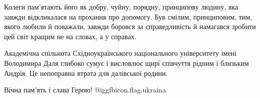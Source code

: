 Колеги пам’ятають його як добру, чуйну, порядну, принципову людину, яка завжди
відкликалася на прохання про допомогу.  Був смілим,  принциповим, тим, якого
любили й поважали, завжди боровся за справедливість й намагався зробити цей
світ кращим не на словах, а у справах.


Академічна спільнота Східноукраїнського національного університету імені
Володимира Даля глибоко сумує і висловлює щирі співчуття рідним і близьким
Андрія. Це непоправна втрата для далівської родини. 

Вічна пам'ять і слава Герою! @igg{fbicon.flag.ukraina}


